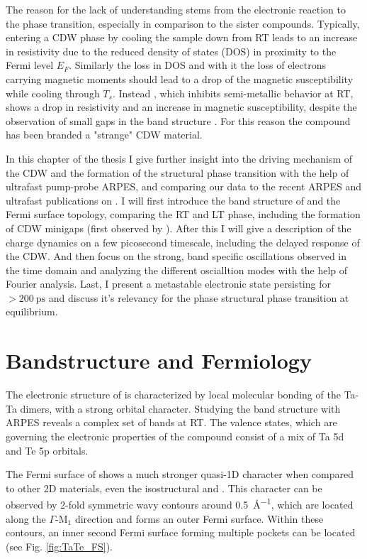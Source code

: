 The reason for the lack of understanding stems from the electronic reaction to the phase transition, especially in comparison to the  sister compounds.
Typically, entering a CDW phase by cooling the sample down from RT leads to an increase in resistivity due to the reduced density of states (DOS) in proximity to the Fermi level $E_F$.
Similarly the loss in DOS and with it the loss of electrons carrying magnetic moments should lead to a drop of the magnetic susceptibility while cooling through $T_s$.
Instead , which inhibits semi-metallic behavior at RT, shows a drop in resistivity and an increase in magnetic susceptibility, despite the observation of small gaps in the band structure \cite{sorgel_new_2006,hu_optical_2022,lin_evidence_2022}.
For this reason the compound has been branded a "strange" CDW material.

In this chapter of the thesis I give further insight into the driving mechanism of the CDW and the formation of the structural phase transition with the help of ultrafast pump-probe ARPES, and comparing our data to the recent ARPES and ultrafast publications on .
I will first introduce the band structure of  and the Fermi surface topology, comparing the RT and LT phase, including the formation of CDW minigaps (first observed by \cite{lin_evidence_2022}).
After this I will give a description of the charge dynamics on a few picosecond timescale, including the delayed response of the CDW.
And then focus on the strong, band specific oscillations observed in the time domain and analyzing the different oscialltion modes with the help of Fourier analysis.
Last, I present a metastable electronic state persisting for $>\qty{200}{\pico\second}$ and discuss it's relevancy for the phase structural phase transition at equilibrium.

\section{Bandstructure and Fermiology}

The electronic structure of  is characterized by local molecular bonding of the Ta-Ta dimers, with a strong orbital character.
Studying the band structure with ARPES reveals a complex set of bands at RT.
The valence states, which are governing the electronic properties of the compound consist of a mix of Ta 5d and Te 5p orbitals. \cite{mitsuishi_unveiling_2024}

The Fermi surface of  shows a much stronger quasi-1D character when compared to other 2D materials, even the isostructural  and .
This character can be observed by 2-fold symmetric wavy contours around \qty{0.5}{\angstrom^{-1}}, which are located along the $\Gamma$-M$_1$ direction and forms an outer Fermi surface.
Within these contours, an inner second Fermi surface forming multiple pockets can be located (see Fig. \ref{fig:TaTe_FS}).

